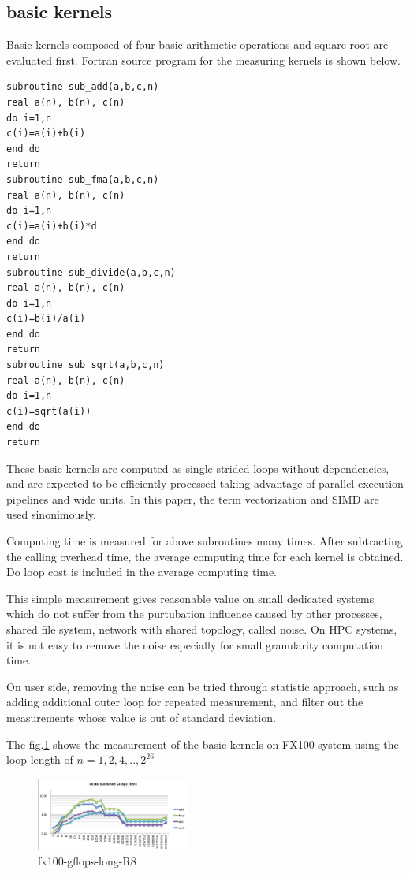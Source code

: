 \documentclass[conference]{IEEEtran}
\begin{document}
\begin{table}[tb]
\end{table}


\subsection{basic kernels}
\label{subsection:basic-kernels}

Basic kernels composed of four basic arithmetic operations and square root
are evaluated first.
Fortran source program for the measuring kernels is shown below.

\begin{lstlisting}[caption={basic kernels}]
subroutine sub_add(a,b,c,n)
real a(n), b(n), c(n)  
do i=1,n
c(i)=a(i)+b(i)
end do
return
subroutine sub_fma(a,b,c,n)
real a(n), b(n), c(n)  
do i=1,n
c(i)=a(i)+b(i)*d
end do
return
subroutine sub_divide(a,b,c,n)
real a(n), b(n), c(n)  
do i=1,n
c(i)=b(i)/a(i)
end do
return
subroutine sub_sqrt(a,b,c,n)
real a(n), b(n), c(n)  
do i=1,n
c(i)=sqrt(a(i))
end do
return
\end{lstlisting}


These basic kernels are computed as single strided loops without dependencies,
and are expected to be efficiently processed taking advantage of parallel
execution pipelines and wide units.
In this paper, the term vectorization and SIMD are used sinonimously.

Computing time is measured for above subroutines many times.
After subtracting the calling overhead time,
the average computing time for each kernel is obtained.
Do loop cost is included in the average computing time.

This simple measurement gives reasonable value on small dedicated systems
which do not suffer from the purtubation influence caused by
other processes, shared file system, network with shared topology,
called noise.
On HPC systems, it is not easy to remove the noise
especially for small granularity computation time.

On user side, removing the noise can be tried through statistic approach,
such as
adding additional outer loop for repeated measurement, and filter out
the measurements whose value is out of standard deviation.


The fig.\ref{fig:fx100-gflops-long-R8} shows the 
measurement of the basic kernels on FX100 system using the loop length of
\begin{math}
n=1,2,4,..,2^{26}
\end{math}

\begin{figure}[tb]
\centering
\includegraphics[width=0.45\textwidth]{figs/fx100-gflops-long-R8.pdf}
\caption{fx100-gflops-long-R8}
\label{fig:fx100-gflops-long-R8}
\end{figure}
\end{document}

